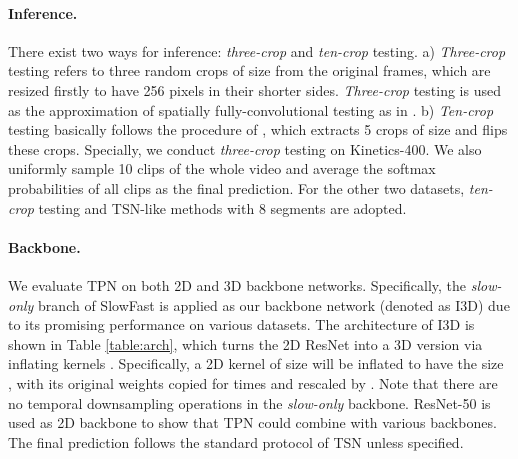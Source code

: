 \documentclass[10pt,twocolumn,letterpaper]{article}
\begin{document}
\paragraph{Inference.}
There exist two ways for inference: \emph{three-crop} and \emph{ten-crop} testing.
a) \emph{Three-crop} testing refers to three random crops of size  from the original frames, which are resized firstly to have 256 pixels in their shorter sides.
\emph{Three-crop} testing is used as the approximation of spatially fully-convolutional testing as in \cite{vggnet, nonlocal, slowfast}. 
b) \emph{Ten-crop} testing basically follows the procedure of \cite{tsn}, which extracts 5 crops of size  and flips these crops.
Specially, we conduct \emph{three-crop} testing on Kinetics-400. We also uniformly sample 10 clips of the whole video and average the softmax probabilities of all clips as the final prediction.
For the other two datasets, \emph{ten-crop} testing and TSN-like methods with 8 segments are adopted. 

\paragraph{Backbone.}
We evaluate TPN on both 2D and 3D backbone networks.
Specifically, the \emph{slow-only} branch of SlowFast \cite{slowfast} is applied as our backbone network (denoted as I3D) due to its promising performance on various datasets. 
The architecture of I3D is shown in Table \ref{table:arch}, which turns the 2D ResNet \cite{resnet} into a 3D version via inflating kernels \cite{nonlocal, kinetics}.
Specifically, a 2D kernel of size  will be inflated to have the size , with its original weights copied for  times and rescaled by .
Note that there are no temporal downsampling operations in the \emph{slow-only} backbone.
ResNet-50 \cite{resnet} is used as 2D backbone to show that TPN could combine with various backbones.
The final prediction follows the standard protocol of TSN \cite{tsn} unless specified.
\end{document}
